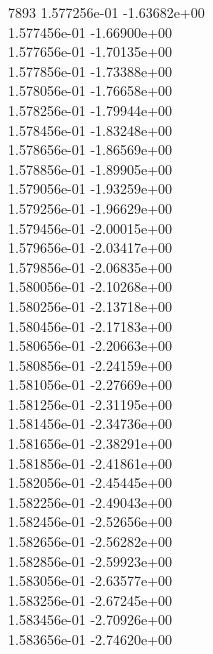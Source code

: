 7893	1.577256e-01	-1.63682e+00	\\ 	1.577456e-01	-1.66900e+00	\\ 	1.577656e-01	-1.70135e+00	\\ 	1.577856e-01	-1.73388e+00	\\ 	1.578056e-01	-1.76658e+00	\\ 	1.578256e-01	-1.79944e+00	\\ 	1.578456e-01	-1.83248e+00	\\ 	1.578656e-01	-1.86569e+00	\\ 	1.578856e-01	-1.89905e+00	\\ 	1.579056e-01	-1.93259e+00	\\ 	1.579256e-01	-1.96629e+00	\\ 	1.579456e-01	-2.00015e+00	\\ 	1.579656e-01	-2.03417e+00	\\ 	1.579856e-01	-2.06835e+00	\\ 	1.580056e-01	-2.10268e+00	\\ 	1.580256e-01	-2.13718e+00	\\ 	1.580456e-01	-2.17183e+00	\\ 	1.580656e-01	-2.20663e+00	\\ 	1.580856e-01	-2.24159e+00	\\ 	1.581056e-01	-2.27669e+00	\\ 	1.581256e-01	-2.31195e+00	\\ 	1.581456e-01	-2.34736e+00	\\ 	1.581656e-01	-2.38291e+00	\\ 	1.581856e-01	-2.41861e+00	\\ 	1.582056e-01	-2.45445e+00	\\ 	1.582256e-01	-2.49043e+00	\\ 	1.582456e-01	-2.52656e+00	\\ 	1.582656e-01	-2.56282e+00	\\ 	1.582856e-01	-2.59923e+00	\\ 	1.583056e-01	-2.63577e+00	\\ 	1.583256e-01	-2.67245e+00	\\ 	1.583456e-01	-2.70926e+00	\\ 	1.583656e-01	-2.74620e+00	\\ \hline
